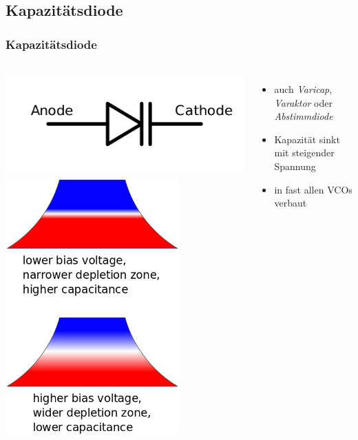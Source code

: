 \subsection*{Kapazitätsdiode}
\begin{frame}
    \frametitle{Kapazitätsdiode}
        \begin{columns}[c]
        \begin{center}
            \includegraphics[width=1\textwidth,height=.3\textheight,keepaspectratio]{a05/Varicap_symbol.png}\\
            \includegraphics[width=0.73\textwidth,height=.55\textheight,keepaspectratio]{a05/Varactor_function.png}
            \tiny \hyperlink{refs}{\cite{wm}}
        \end{center}
    \begin{itemize}
			\item auch \emph{Varicap}, \emph{Varaktor} oder \emph{Abstimmdiode}
			\item Kapazität sinkt mit steigender Spannung
			\item in fast allen VCOs verbaut
    \end{itemize}
    \end{columns}
\end{frame}

